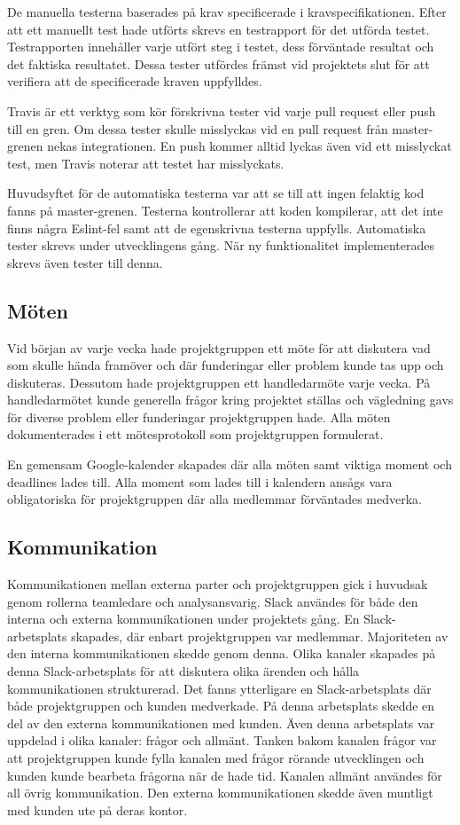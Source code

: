 De manuella testerna baserades på krav specificerade i kravspecifikationen. Efter att ett manuellt test hade utförts skrevs en testrapport för det utförda testet. Testrapporten innehåller varje utfört steg i testet, dess förväntade resultat och det faktiska resultatet. Dessa tester utfördes främst vid projektets slut för att verifiera att de specificerade kraven uppfylldes.

Travis är ett verktyg som kör förskrivna tester vid varje pull request eller push till en gren. Om dessa tester skulle misslyckas vid en pull request från master-grenen nekas integrationen. En push kommer alltid lyckas även vid ett misslyckat test, men Travis noterar att testet har misslyckats.

Huvudsyftet för de automatiska testerna var att se till att ingen felaktig kod fanns på master-grenen. Testerna kontrollerar att koden kompilerar, att det inte finns några Eslint-fel samt att de egenskrivna testerna uppfylls. Automatiska tester skrevs under utvecklingens gång. När ny funktionalitet implementerades skrevs även tester till denna.

\subsection{Möten}
Vid början av varje vecka hade projektgruppen ett möte för att diskutera vad som skulle hända framöver och där funderingar eller problem kunde tas upp och diskuteras. Dessutom hade projektgruppen ett handledarmöte varje vecka. På handledarmötet kunde generella frågor kring projektet ställas och vägledning gavs för diverse problem eller funderingar projektgruppen hade. Alla möten dokumenterades i ett mötesprotokoll som projektgruppen formulerat.

En gemensam Google-kalender skapades där alla möten samt viktiga moment och deadlines lades till. Alla moment som lades till i kalendern ansågs vara obligatoriska för projektgruppen där alla medlemmar förväntades medverka.

\subsection{Kommunikation}
Kommunikationen mellan externa parter och projektgruppen gick i huvudsak genom rollerna teamledare och analysansvarig. Slack användes för både den interna och externa kommunikationen under projektets gång. En Slack-arbetsplats skapades, där enbart projektgruppen var medlemmar. Majoriteten av den interna kommunikationen skedde genom denna. Olika kanaler skapades på denna Slack-arbetsplats för att diskutera olika ärenden och hålla kommunikationen strukturerad. Det fanns ytterligare en Slack-arbetsplats där både projektgruppen och kunden medverkade. På denna arbetsplats skedde en del av den externa kommunikationen med kunden. Även denna arbetsplats var uppdelad i olika kanaler: frågor och allmänt. Tanken bakom kanalen frågor var att projektgruppen kunde fylla kanalen med frågor rörande utvecklingen och kunden kunde bearbeta frågorna när de hade tid. Kanalen allmänt användes för all övrig kommunikation. Den externa kommunikationen skedde även muntligt med kunden ute på deras kontor.

